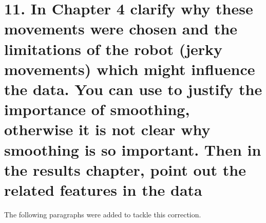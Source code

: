 \documentclass[12pt]{article}
\begin{document}
\section*{11. 
In Chapter 4 clarify why these movements were chosen
and the limitations of the robot (jerky movements)
which might influence the data. You can use to justify 
the importance of smoothing, otherwise it is not clear
why smoothing is so important. 
Then in the results chapter, 
point out the related features in the data
}


The following paragraphs were added to tackle this correction.



%

\end{document}
